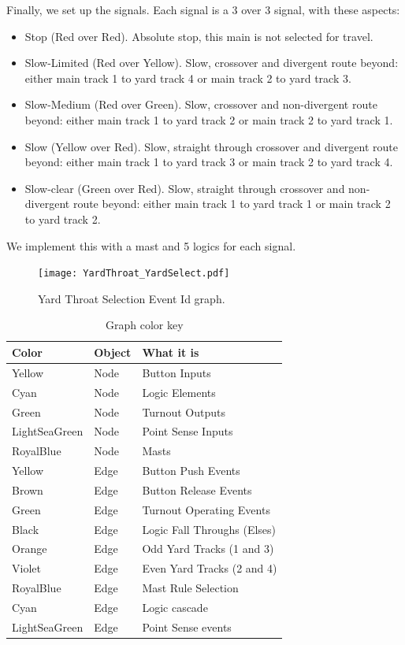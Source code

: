 Finally, we set up the signals.  Each signal is a 3 over 3 signal, with these 
aspects:

\begin{itemize}
\item Stop (Red over Red). Absolute stop, this main is not selected for 
travel.
\item Slow-Limited (Red over Yellow). Slow, crossover and divergent route 
beyond: either main track 1 to yard track 4 or main track 2 to yard track 3.
\item Slow-Medium (Red over Green). Slow, crossover and non-divergent route 
beyond: either main track 1 to yard track 2 or main track 2 to yard track 1.
\item Slow (Yellow over Red). Slow, straight through crossover and 
divergent route beyond: either main track 1 to yard track 3 or main track 2 to 
yard track 4.
\item Slow-clear (Green over Red). Slow, straight through crossover and 
non-divergent route beyond: either main track 1 to yard track 1 or main track 
2 to yard track 2.
\end{itemize}

We implement this with a mast and 5 logics for each signal. 

\begin{figure}[hbpt]\begin{centering}%
\texttt{[image: YardThroat\_YardSelect.pdf]}
\caption{Yard Throat Selection Event Id graph.}
\label{fig:YardThroatYardSelect}
\end{centering}\end{figure}
\begin{table}[hbpt]\begin{centering}%
\begin{tabular}{|l|l|p{2in}|}
\hline
Color&Object&What it is\\
\hline
Yellow&Node&Button Inputs\\
\hline
Cyan&Node&Logic Elements\\
\hline
Green&Node&Turnout Outputs\\
\hline
LightSeaGreen&Node&Point Sense Inputs\\
\hline
RoyalBlue&Node&Masts\\
\hline 
Yellow&Edge&Button Push Events\\
\hline
Brown&Edge&Button Release Events\\
\hline
Green&Edge&Turnout Operating Events\\
\hline
Black&Edge&Logic Fall Throughs (Elses)\\
\hline
Orange&Edge&Odd Yard Tracks (1 and 3)\\
\hline
Violet&Edge&Even Yard Tracks (2 and 4)\\
\hline
RoyalBlue&Edge&Mast Rule Selection\\
\hline
Cyan&Edge&Logic cascade\\
\hline
LightSeaGreen&Edge&Point Sense events\\
\hline
\end{tabular}
\caption{Graph color key}
\label{tab:YardThroatYardSelect}
\end{centering}\end{table}

